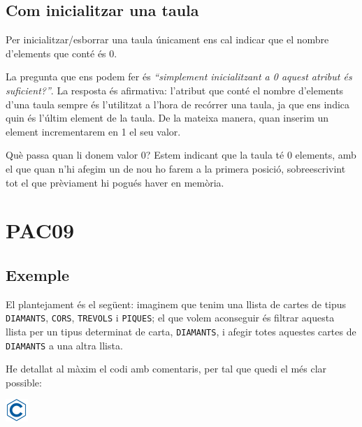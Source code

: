 \documentclass[]{book}
\begin{document}
\section{Com inicialitzar una taula}\label{com-inicialitzar-una-taula}

Per inicialitzar/esborrar una taula únicament ens cal indicar que el
nombre d'elements que conté és 0.

La pregunta que ens podem fer és \emph{``simplement inicialitzant a 0
aquest atribut és suficient?''}. La resposta és afirmativa: l'atribut
que conté el nombre d'elements d'una taula sempre és l'utilitzat a
l'hora de recórrer una taula, ja que ens indica quin és l'últim element
de la taula. De la mateixa manera, quan inserim un element incrementarem
en 1 el seu valor.

Què passa quan li donem valor 0? Estem indicant que la taula té 0
elements, amb el que quan n'hi afegim un de nou ho farem a la primera
posició, sobreescrivint tot el que prèviament hi pogués haver en
memòria.

\chapter{PAC09}\label{pac09}

\section{Exemple}\label{exemple-4}

El plantejament és el següent: imaginem que tenim una llista de cartes
de tipus \texttt{DIAMANTS}, \texttt{CORS}, \texttt{TREVOLS} i
\texttt{PIQUES}; el que volem aconseguir és filtrar aquesta llista per
un tipus determinat de carta, \texttt{DIAMANTS}, i afegir totes aquestes
cartes de \texttt{DIAMANTS} a una altra llista.

He detallat al màxim el codi amb comentaris, per tal que quedi el més
clar possible:

\includegraphics{./img/c.png}
\end{document}
